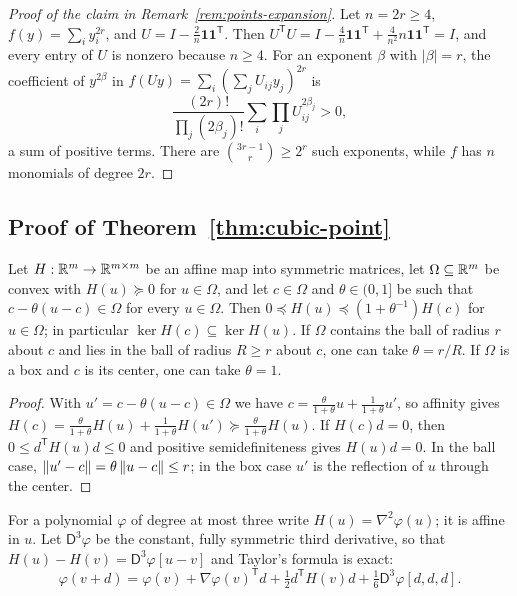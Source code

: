 \begin{proof}[Proof of the claim in Remark~\ref{rem:points-expansion}]
Let $n=2r\ge4$, $f(y)=\sum_iy_i^{2r}$, and $U=I-\tfrac2n\mathbf1\mathbf1^{\mathsf
T}$. Then $U^{\mathsf T}U=I-\tfrac4n\mathbf1\mathbf1^{\mathsf T}+
\tfrac4{n^2}n\mathbf1\mathbf1^{\mathsf T}=I$, and every entry of $U$ is
nonzero because $n\ge4$. For an exponent $\beta$ with $|\beta|=r$, the
coefficient of $y^{2\beta}$ in $f(Uy)=\sum_i(\sum_jU_{ij}y_j)^{2r}$ is
\[
 \frac{(2r)!}{\prod_j(2\beta_j)!}\sum_i\prod_jU_{ij}^{2\beta_j}>0 ,
\]
a sum of positive terms. There are $\binom{3r-1}r\ge2^r$ such exponents,
while $f$ has $n$ monomials of degree $2r$.
\end{proof}

\subsection{Proof of Theorem~\ref{thm:cubic-point}}\label{app:points-cubic}

\begin{lemma}[Reflection]\label{lem:points-reflection}
Let $H:\mathbb R^m\to\mathbb R^{m\times m}$ be an affine map into symmetric matrices, let
$\Omega\subseteq\mathbb R^m$ be convex with $H(u)\succeq0$ for $u\in\Omega$, and let
$c\in\Omega$ and $\theta\in(0,1]$ be such that $c-\theta(u-c)\in\Omega$ for
every $u\in\Omega$. Then $0\preceq H(u)\preceq(1+\theta^{-1})H(c)$ for
$u\in\Omega$; in particular $\ker H(c)\subseteq\ker H(u)$. If $\Omega$
contains the ball of radius $r$ about $c$ and lies in the ball of radius
$R\ge r$ about $c$, one can take $\theta=r/R$. If $\Omega$ is a box and $c$
is its center, one can take $\theta=1$.
\end{lemma}

\begin{proof}
With $u'=c-\theta(u-c)\in\Omega$ we have
$c=\frac\theta{1+\theta}u+\frac1{1+\theta}u'$, so affinity gives
$H(c)=\frac\theta{1+\theta}H(u)+\frac1{1+\theta}H(u')\succeq
\frac\theta{1+\theta}H(u)$. If $H(c)d=0$, then $0\le d^{\mathsf T}H(u)d\le0$
and positive semidefiniteness gives $H(u)d=0$. In the ball case,
$\left\lVert u'-c\right\rVert=\theta\left\lVert u-c\right\rVert\le r$; in the box case $u'$ is the reflection
of $u$ through the center.
\end{proof}

For a polynomial $\varphi$ of degree at most three write
$H(u)=\nabla^2\varphi(u)$; it is affine in $u$. Let $\mathsf D^3\varphi$ be
the constant, fully symmetric third derivative, so that
$H(u)-H(v)=\mathsf D^3\varphi[u-v]$ and Taylor's formula is exact:
\begin{equation}\label{eq:points-cubic-taylor}
 \varphi(v+d)=\varphi(v)+\nabla\varphi(v)^{\mathsf T}d+\tfrac12d^{\mathsf
 T}H(v)d+\tfrac16\mathsf D^3\varphi[d,d,d].
\end{equation}

